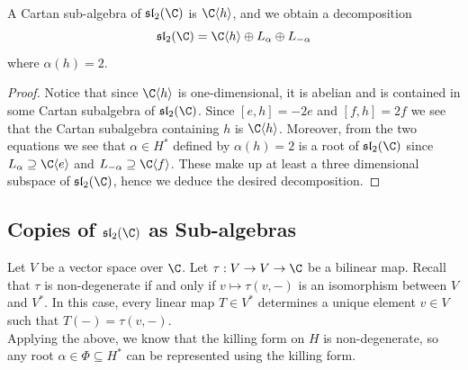\documentclass[a4paper]{article}
\begin{document}
\begin{eg}{}{} \\A Cartan sub-algebra of $\mathfrak{sl}_2(\C)$ is $\C\langle h\rangle$, and we obtain a decomposition $$\mathfrak{sl}_2(\C)=\C\langle h\rangle\oplus L_\alpha\oplus L_{-\alpha}$$ where $\alpha(h)=2$. 
\begin{proof}
Notice that since $\C\langle h\rangle$ is one-dimensional, it is abelian and is contained in some Cartan subalgebra of $\mathfrak{sl}_2(\C)$. Since $[e,h]=-2e$ and $[f,h]=2f$ we see that the Cartan subalgebra containing $h$ is $\C\langle h\rangle$. Moreover, from the two equations we see that $\alpha\in H^\ast$ defined by $\alpha(h)=2$ is a root of $\mathfrak{sl}_2(\C)$ since $L_\alpha\supseteq\C\langle e\rangle$ and $L_{-\alpha}\supseteq\C\langle f\rangle$. These make up at least a three dimensional subspace of $\mathfrak{sl}_2(\C)$, hence we deduce the desired decomposition. 
\end{proof}
\end{eg}

\subsection{Copies of $\mathfrak{sl}_2(\C)$ as Sub-algebras}
Let $V$ be a vector space over $\C$. Let $\tau:V\to V\to\C$ be a bilinear map. Recall that $\tau$ is non-degenerate if and only if $v\mapsto\tau(v,-)$ is an isomorphism between $V$ and $V^\ast$. In this case, every linear map $T\in V^\ast$ determines a unique element $v\in V$ such that $T(-)=\tau(v,-)$. \\

Applying the above, we know that the killing form on $H$ is non-degenerate, so any root $\alpha\in\Phi\subseteq H^\ast$ can be represented using the killing form. 
\end{document}
